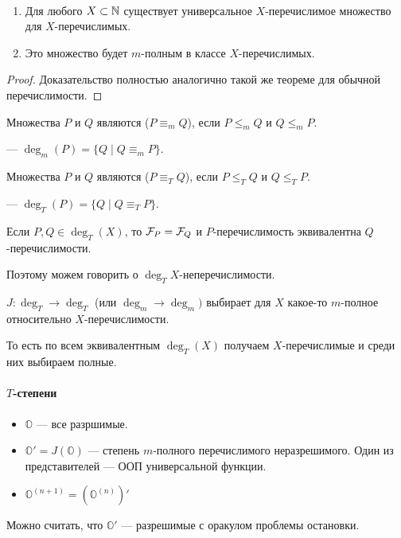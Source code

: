 \begin{thm}
	~\begin{enumerate}
	    \item Для любого $X \subset \mathbb{N}  $ существует универсальное $ X$-перечислимое множество для $ X$-перечислимых.
		\item Это множество будет $ m$-полным в классе $ X$-перечислимых.
	\end{enumerate} 
\end{thm}
	\begin{proof}
	    Доказательство полностью аналогично такой же теореме для обычной перечислимости.
	\end{proof}

\begin{defn}[]
	Множества $ P$ и $ Q$ являются  ($ P \equiv _m Q$), если $ P \le _m Q$ и $ Q \le _m P$.

	\noindent
	 --- $ \deg_m(P) = \{Q \mid Q \equiv _m P\} $.
\end{defn}

\begin{defn}[]
	Множества $ P$ и $ Q$ являются  ($ P \equiv _T Q$), если $ P \le _T Q$ и $ Q \le _T P$.

	\noindent
	 --- $ \deg_T(P) = \{Q \mid Q \equiv _T P\} $.
\end{defn}

\begin{note}
	Если $ P, Q \in \deg_T(X)$, то $ \mathcal{F}_P = \mathcal{F}_Q$ и  $ P$-перечислимость  эквивалентна  $ Q$-перечислимости.

	Поэтому можем говорить о $\deg_T X$-неперечислимости.
\end{note}

\begin{defn}
	 $ J\colon \deg_T \to \deg_T $ (или $ \deg_m \to \deg_m) $ выбирает для $ X$ какое-то $ m$-полное относительно $ X$-перечислимости.

	\noindent
	То есть по всем эквивалентным $ \deg_T(X)$ получаем $ X$-перечислимые и среди них выбираем полные. 
\end{defn}
\begin{figure}[ht]
    \centering
    \label{fig:jump-img}
\end{figure}

\paragraph{$ T$-степени}
\begin{itemize}
	\item $ \mathbb{O}$ --- все разршимые.
	\item $ \mathbb{O}' = J(\mathbb{O}) $ --- степень $ m$-полного перечислимого неразрешимого. Один из представителей --- ООП универсальной функции.
	\item $ \mathbb{O}^{(n+1)}= \left(\mathbb{O}^{(n)}\right)'$
\end{itemize}
Можно считать, что $ \mathbb{O}'$ --- разрешимые с оракулом проблемы остановки. 

